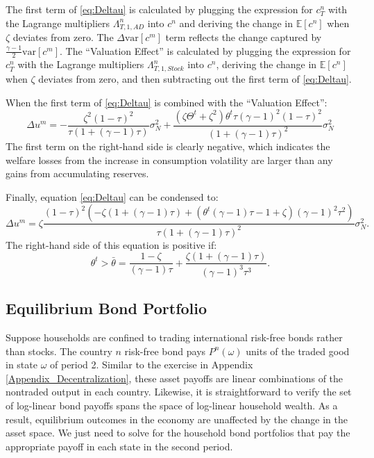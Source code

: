 The first term of \eqref{eq:Deltau} is calculated by plugging the
expression for $c^n_T$ with the Lagrange multipliers
$\Lambda^n_{T, 1, AD}$ into $c^n$ and deriving the change in
$\mathbb{E}\left[ c^n \right]$ when $\zeta$ deviates from zero. The
$\Delta \text{var}\left[ c^m \right]$ term reflects the change
captured by $\frac{\gamma - 1}{2}\text{var}\left[ c^m \right]$. The
``Valuation Effect'' is calculated by plugging the expression for
$c^n_T$ with the Lagrange multipliers $\Lambda^n_{T, 1, Stock}$ into
$c^n$, deriving the change in $\mathbb{E}\left[ c^n \right]$ when
$\zeta$ deviates from zero, and then subtracting out the first term of
\eqref{eq:Deltau}.

When the first term of \eqref{eq:Deltau} is combined with the
``Valuation Effect'':
\begin{equation*}
  \Delta u^m
  = - \frac{\zeta^2 (1 - \tau)^2 }{
    \tau \left( 1 + (\gamma - 1) \tau\right)} \sigma_N^2
  + \frac{ \left( \zeta \Theta^t + \zeta^2 \right)
    \theta^t \tau (\gamma - 1)^2 (1 - \tau)^2 }{
    \left( 1 + (\gamma - 1) \tau \right)^2} \sigma_N^2
\end{equation*}
The first term on the right-hand side is clearly negative, which
indicates the welfare losses from the increase in consumption
volatility are larger than any gains from accumulating reserves.

Finally, equation \eqref{eq:Deltau} can be condensed to:
\begin{equation*}
  \Delta u^m = \zeta
  \frac{(1 - \tau)^2
    \left( - \zeta \left( 1 + (\gamma - 1) \tau \right) 
      + (\theta^t (\gamma - 1) \tau - 1 + \zeta)(\gamma - 1)^2 \tau^2 \right)}
  {\tau \left( 1 + (\gamma - 1) \tau \right)^2} \sigma_N^2.
\end{equation*}
The right-hand side of this equation is positive if:
\begin{equation*}
  \theta^t
  > \bar{\theta}
  = \frac{1 - \zeta}{(\gamma - 1) \tau}
  + \frac{\zeta (1 + (\gamma - 1) \tau)}{(\gamma - 1)^3 \tau^3}.
\end{equation*}


\subsection{Equilibrium Bond Portfolio
  \label{Appendix_BondDecentralization}}

Suppose households are confined to trading international risk-free
bonds rather than stocks. The country $n$ risk-free bond pays
$P^n(\omega)$ units of the traded good in state $\omega$ of period 2.
Similar to the exercise in Appendix \ref{Appendix_Decentralization},
these asset payoffs are linear combinations of the nontraded output in
each country. Likewise, it is straightforward to verify the set of
log-linear bond payoffs spans the space of log-linear household
wealth. As a result, equilibrium outcomes in the economy are
unaffected by the change in the asset space. We just need to solve for
the household bond portfolios that pay the appropriate payoff in each
state in the second period.

